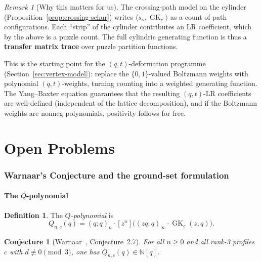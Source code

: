 \documentclass[11pt]{article}
\theoremstyle{plain}
\newtheorem{conjecture}[theorem]{Conjecture}
\theoremstyle{definition}
\newtheorem{definition}[theorem]{Definition}
\theoremstyle{remark}
\newtheorem{remark}[theorem]{Remark}
\newcommand{\N}{\mathbb{N}}
\newcommand{\GK}{\operatorname{GK}}
\newcommand{\qpoch}[2]{(#1;#2)_\infty}
\newcommand{\qpochn}[3]{(#1;#2)_{#3}}
\begin{document}
\begin{remark}[Why this matters for us]\label{rem:why-this-matters}
The crossing-path model on the cylinder
(Proposition~\ref{prop:crossing-schur}) writes
$\langle s_\kappa, \GK_c \rangle$ as a count of path
configurations.  Each ``strip'' of the cylinder contributes an
LR coefficient, which by the above is a puzzle count.
The full cylindric generating function is thus a
\textbf{transfer matrix trace} over puzzle partition functions.

This is the starting point for the $(q,t)$-deformation
programme (Section~\ref{sec:vertex-model}): replace the
$\{0,1\}$-valued Boltzmann weights with polynomial
$(q,t)$-weights, turning counting into a weighted generating
function.  The Yang--Baxter equation guarantees that the
resulting $(q,t)$-LR coefficients are well-defined
(independent of the lattice decomposition), and if the
Boltzmann weights are nonneg polynomials, positivity follows
for free.
\end{remark}


\part{Open Problems}
\label{part:problems}

\section{Warnaar's Conjecture and the ground-set formulation}
\label{sec:conjecture}

\subsection{The $Q$-polynomial}

\begin{definition}\label{def:Q}
The \emph{$Q$-polynomial} is
\begin{equation}\label{eq:Q-def}
  Q_{n,c}(q)
  = \qpochn{q}{q}{n}
    \cdot [z^n]\bigl(\qpoch{zq}{q} \cdot \GK_c(z,q)\bigr).
\end{equation}
\end{definition}

\begin{conjecture}[Warnaar~\cite{warnaar-2021}, Conjecture~2.7]
\label{conj:main}
For all $n \geq 0$ and all rank-3 profiles $c$ with
$d \not\equiv 0 \pmod{3}$, one has
$Q_{n,c}(q) \in \N[q]$.
\end{conjecture}
\end{document}

